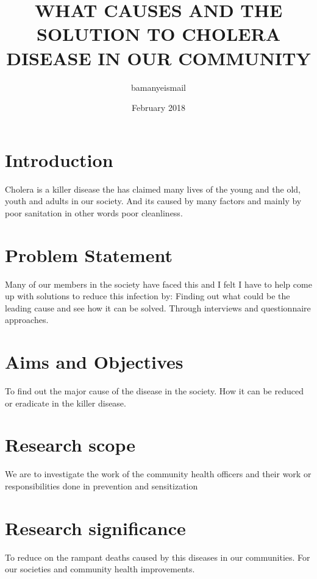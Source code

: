 \documentclass{article}
\title{WHAT CAUSES  AND THE SOLUTION TO CHOLERA DISEASE IN OUR COMMUNITY}
\author{bamanyeismail }
\date{February 2018}
\begin{document}
\maketitle

\section{Introduction}
Cholera is a killer disease the has claimed many lives of the young and the old, youth and adults in our society. And its caused by many factors and mainly by poor sanitation in other words poor  cleanliness.
\section{Problem Statement}
Many of our members in the society have faced this and I felt I have to help come up with solutions to reduce this infection by: Finding out what could be the leading cause and see how it can be solved. Through interviews and questionnaire approaches.
\section{Aims and Objectives} 
To find out the major cause of the disease in the society.
How it can be reduced or eradicate in the killer disease.
\section{Research scope}
We are to investigate the work of the community health officers and their work or responsibilities done in prevention and sensitization 
\section{Research significance}
To reduce on the rampant deaths caused by this diseases in our communities.
For our societies and community health improvements.
\end{document}
